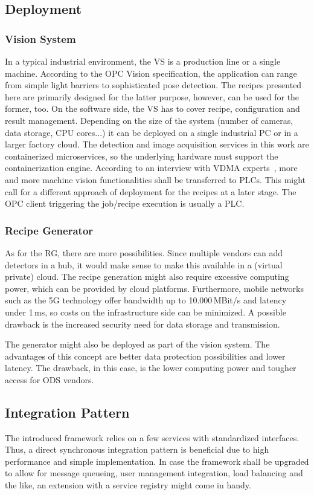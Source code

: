 \subsection{Deployment}
\subsubsection{Vision System}
In a typical industrial environment, the VS is a production line or a single machine. According to the OPC Vision specification, the application can range from simple light barriers to sophisticated pose detection. The recipes presented here are primarily designed for the latter purpose, however, can be used for the former, too. On the software side, the VS has to cover recipe, configuration and result management. Depending on the size of the system (number of cameras, data storage, CPU cores...) it can be deployed on a single industrial PC or in a larger factory cloud. The detection and image acquisition services in this work are containerized microservices, so the underlying hardware must support the containerization engine. According to an interview with VDMA experts~\cite{VDMA2018OPC40100-1:2018-11}, more and more machine vision functionalities shall be transferred to PLCs. This might call for a different approach of deployment for the recipes at a later stage. The OPC client triggering the job/recipe execution is usually a PLC.

\subsubsection{Recipe Generator}
As for the RG, there are more possibilities. Since multiple vendors can add detectors in a hub, it would make sense to make this available in a (virtual private) cloud. The recipe generation might also require excessive computing power, which can be provided by cloud platforms. Furthermore, mobile networks such as the 5G technology offer bandwidth up to 10.000\,MBit/s and latency under 1\,ms, so costs on the infrastructure side can be minimized. A possible drawback is the increased security need for data storage and transmission.

The generator might also be deployed as part of the vision system. The advantages of this concept are better data protection possibilities and lower latency. The drawback, in this case, is the lower computing power and tougher access for ODS vendors.

\subsection{Integration Pattern}
The introduced framework relies on a few services with standardized interfaces. Thus, a direct synchronous integration pattern is beneficial due to high performance and simple implementation. In case the framework shall be upgraded to allow for message queueing, user management integration, load balancing and the like, an extension with a service registry might come in handy.

